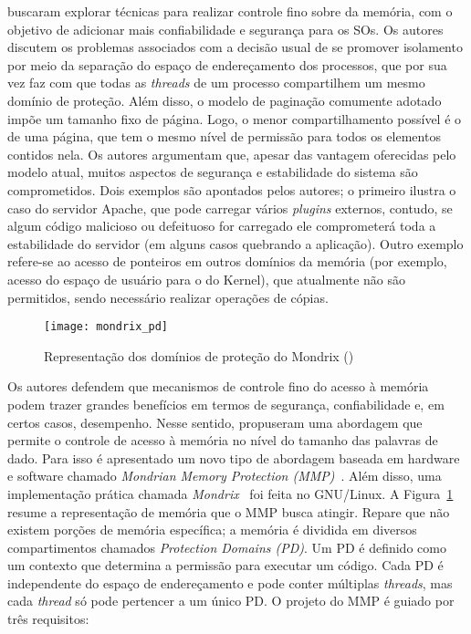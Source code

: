 \citet{mmp} buscaram explorar técnicas para realizar controle fino sobre da
memória, com o objetivo de adicionar mais confiabilidade e segurança para os
SOs. Os autores discutem os problemas associados com a decisão usual de se promover
isolamento por meio da separação do espaço de endereçamento dos processos, que
por sua vez faz com que todas as \emph{threads} de um processo compartilhem um
mesmo domínio de proteção. Além disso, o modelo de paginação comumente adotado impõe um
tamanho fixo de página. Logo, o menor compartilhamento possível é o de uma página, que
tem o mesmo nível de permissão para todos os elementos contidos nela. Os autores
argumentam que, apesar das vantagem oferecidas pelo modelo atual, muitos
aspectos de segurança e estabilidade do sistema são comprometidos. Dois
exemplos são apontados pelos autores; o primeiro ilustra o caso do servidor
Apache, que pode carregar vários \textit{plugins} externos, contudo, se algum
código malicioso ou defeituoso for carregado ele comprometerá toda a
estabilidade do servidor (em alguns casos quebrando a aplicação). Outro exemplo
refere-se ao acesso de ponteiros em outros domínios da memória (por exemplo,
acesso do espaço de usuário para o do Kernel), que atualmente não são permitidos,
sendo necessário realizar operações de cópias.

\begin{figure}[!h]
  \centering
  \texttt{[image: mondrix\_pd]}
	\caption[Representação dos domínios de proteção do Mondrix]{Representação dos domínios de proteção do Mondrix (\cite{mondrix})}
  \label{fig:mondrixPD} 
\end{figure}

Os autores defendem que mecanismos de controle fino do acesso à memória podem
trazer grandes benefícios em termos de segurança, confiabilidade e, em certos
casos, desempenho. Nesse sentido, \citet{mmp} propuseram uma abordagem
que permite o controle de acesso à memória no nível do tamanho das palavras de
dado. Para isso é apresentado um novo tipo de abordagem baseada em hardware e
software chamado \emph{Mondrian Memory Protection (MMP)}~\citep{mmp}. Além
disso, uma implementação prática chamada \emph{Mondrix}~\cite{mondrix} foi
feita no GNU/Linux. A Figura~\ref{fig:mondrixPD} resume a representação de
memória que o MMP busca atingir. Repare que não existem porções de memória
específica; a memória é dividida em diversos compartimentos chamados
\emph{Protection Domains (PD)}. Um PD é definido como um contexto que determina
a permissão para executar um código. Cada PD é independente do espaço de
endereçamento e pode conter múltiplas \emph{threads}, mas cada \emph{thread} só
pode pertencer a um único PD.  O projeto do MMP é guiado por três requisitos:

